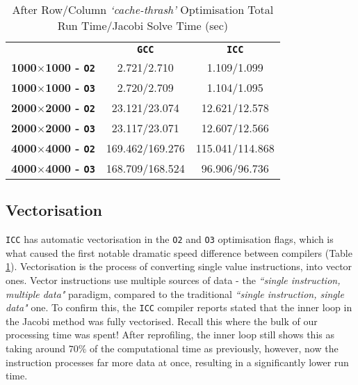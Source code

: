 \documentclass[10pt,twocolumn,a4paper]{article}
\begin{document}
\begin{table}
\small
\centering
\begin{tabular}{l|c|c}
                     & \textbf{\texttt{GCC}} & \textbf{\texttt{ICC}} \\
\textbf{1000$\times$1000 - \texttt{O2}} & 2.721/2.710     & 1.109/1.099     \\
\textbf{1000$\times$1000 - \texttt{O3}} & 2.720/2.709     & 1.104/1.095     \\
\textbf{2000$\times$2000 - \texttt{O2}} & 23.121/23.074   & 12.621/12.578   \\
\textbf{2000$\times$2000 - \texttt{O3}} & 23.117/23.071   & 12.607/12.566   \\
\textbf{4000$\times$4000 - \texttt{O2}} & 169.462/169.276 & 115.041/114.868 \\
\textbf{4000$\times$4000 - \texttt{O3}} & 168.709/168.524 & 96.906/96.736
\end{tabular}
\caption{After Row/Column \textit{`cache-thrash'} Optimisation Total Run Time/Jacobi Solve Time (sec)}
\label{cacheThrash}
\end{table}\par

\subsection{Vectorisation}
\texttt{ICC} has automatic vectorisation in the \texttt{O2} and \texttt{O3} optimisation flags, which is what caused the first notable dramatic speed difference between compilers (Table \ref{cacheThrash}). Vectorisation is the process of converting single value instructions, into vector ones. Vector instructions use multiple sources of data - the \textit{``single instruction, multiple data"} paradigm, compared to the traditional \textit{``single instruction, single data"} one. To confirm this, the \texttt{ICC} compiler reports stated that the inner loop in the Jacobi method was fully vectorised. Recall this where the bulk of our processing time was spent! After reprofiling, the inner loop still shows this as taking around $70\%$ of the computational time as previously, however, now the instruction processes far more data at once, resulting in a significantly lower run time. \par
\end{document}
